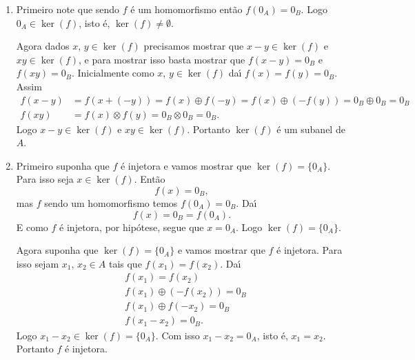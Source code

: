\begin{prova}
    \begin{enumerate}[label={\roman*})]
        \item Primeiro note que sendo $f$ \'e um homomorfismo ent\~ao $f(0_A) = 0_B$. Logo $0_A \in \ker(f)$, isto \'e, $\ker(f) \ne \emptyset$.

        Agora dados $x$, $y \in \ker(f)$ precisamos mostrar que $x - y \in \ker(f)$ e $xy \in \ker(f)$, e para mostrar isso basta mostrar que $f(x - y) = 0_B$ e$f(xy) = 0_B$.
        Inicialmente como $x$, $y \in \ker(f)$ da{\'\i} $f(x) = f(y) = 0_B$. Assim
        \begin{align*}
            f(x - y) &= f(x + (-y)) = f(x) \oplus f(-y) = f(x) \oplus (-f(y)) = 0_B \oplus 0_B = 0_B\\
            f(xy) &= f(x)\otimes f(y) = 0_B \otimes 0_B = 0_B.
        \end{align*}
        Logo $x - y \in \ker(f)$ e $xy \in \ker(f)$. Portanto $\ker(f)$ \'e um subanel de $A$.

        \item Primeiro suponha que $f$ \'e injetora e vamos mostrar que $\ker(f) = \{0_A\}$. Para isso seja $x \in \ker(f)$. Ent\~ao
        \[
            f(x) = 0_B,
        \]
        mas $f$ sendo um homomorfismo temos $f(0_A) = 0_B$. Da{\'\i}
        \[
            f(x) = 0_B = f(0_A).
        \]
        E como $f$ \'e injetora, por hip\'otese, segue que $x = 0_A$. Logo $\ker(f) = \{0_A\}$.

        Agora suponha que $\ker(f) = \{0_A\}$ e vamos mostrar que $f$ \'e injetora. Para isso sejam $x_1$, $x_2 \in A$ tais que $f(x_1) = f(x_2)$. Da{\'\i}
        \begin{align*}
            &f(x_1) = f(x_2)\\
            &f(x_1) \oplus (-f(x_2)) = 0_B\\
            &f(x_1) \oplus f(-x_2) = 0_B\\
            &f(x_1 - x_2) = 0_B.
        \end{align*}
        Logo $x_1 - x_2 \in \ker(f) = \{0_A\}$. Com isso $x_1 - x_2 = 0_A$, isto \'e, $x_1 = x_2$. Portanto $f$ \'e injetora.
    \end{enumerate}
\end{prova}

